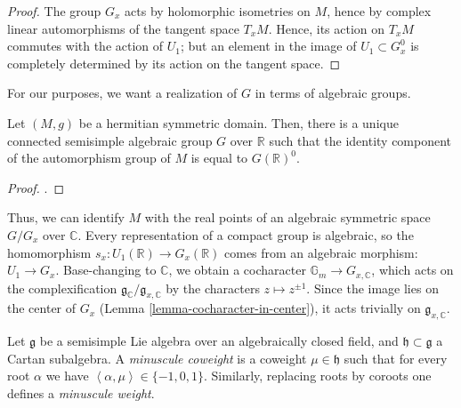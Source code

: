 \begin{proof}
The group $G_x$ acts by holomorphic isometries on $M$, hence by complex linear automorphisms of the tangent space $T_x M$. Hence, its action on $T_x M$ commutes with the action of $U_1$; but an element in the image of $U_1\subset G_x^0$ is completely determined by its action on the tangent space.
\end{proof}



For our purposes, we want a realization of $G$ in terms of algebraic groups.

\begin{lemma}
 \label{lemma-hermitian-automorphisms-algebraic}
Let $(M,g)$ be a hermitian symmetric domain. Then, there is a unique connected semisimple algebraic group $G$ over $\mathbb R$ such that the identity component of the automorphism group of $M$ is equal to $G(\mathbb R)^0$.
\end{lemma}

\begin{proof}
 \cite[Proposition 1.7]{Milne-Shimura}.
\end{proof}

Thus, we can identify $M$ with the real points of an algebraic symmetric space $G/G_x$ over $\mathbb C$.
Every representation of a compact group is algebraic, so the homomorphism $s_x: U_1(\mathbb R) \to G_x(\mathbb R)$ comes from an algebraic morphism: $U_1 \to G_x$. Base-changing to $\mathbb C$, we obtain a cocharacter $\mathbb G_m \to G_{x,\mathbb C}$, which acts on the complexification $\mathfrak g_{\mathbb C}/\mathfrak g_{x,\mathbb C}$ by the characters $z\mapsto z^{\pm 1}$. Since the image lies on the center of $G_x$ (Lemma \ref{lemma-cocharacter-in-center}), it acts trivially on $\mathfrak g_{x,\mathbb C}$. 

\begin{definition}
 \label{definition-minuscule-weight}
Let $\mathfrak g$ be a semisimple Lie algebra over an algebraically closed field, and $\mathfrak h\subset \mathfrak g$ a Cartan subalgebra. A {\it minuscule coweight} is a coweight $\mu\in \mathfrak h$ such that for every root $\alpha$ we have $\left< \alpha, \mu\right> \in \{ -1, 0, 1\}$. Similarly, replacing roots by coroots one defines a {\it minuscule weight}.
\end{definition}

